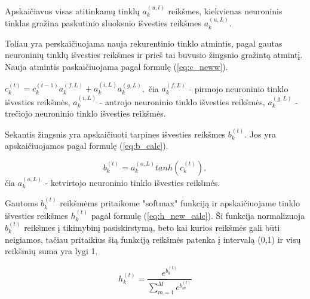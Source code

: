 Apskaičiavus visas atitinkamų tinklų \begin{math}a_k^{(u,l)}\end{math} reikšmes, kiekvienas neuroninis tinklas gražina paskutinio sluoksnio išvesties reikšmes \begin{math}a_k^{(u,L)}\end{math}.

Toliau yra perskaičiuojama nauja rekurentinio tinklo atmintis, pagal gautas neuroninių tinklų išvesties reikšmes ir prieš tai buvusio žingsnio gražintą atmintį. Nauja atmintis paskaičiuojama pagal formulę (\ref{eq:c_neww}).

\begin{math}\label{eq:c_neww}
  c_k^{(t)} = c_k^{(t-1)}a_k^{(f,L)} + a_k^{(i,L)}a_k^{(g,L)},
\end{math}
čia \begin{math}a_k^{(f,L)}\end{math} - pirmojo neuroninio tinklo išvesties reikšmės, \begin{math}a_k^{(i,L)}\end{math} - antrojo neuroninio tinklo išvesties reikšmės, \begin{math}a_k^{(g,L)}\end{math} - trečiojo neuroninio tinklo išvesties reikšmės.

Sekantis žingsnis yra apskaičiuoti tarpines išvesties reikšmes \begin{math}b_k^{(t)}\end{math}. Jos yra apskaičiuojamos pagal formulę (\ref{eq:b_calc}).

\begin{equation}\label{eq:b_calc}
  b_k^{(t)} = a_k^{(o,L)}tanh(c_k^{(t)}),
\end{equation}
čia \begin{math}a_k^{(o,L)}\end{math} - ketvirtojo neuroninio tinklo išvesties reikšmės.

Gautoms \begin{math}b_k^{(t)}\end{math} reikšmėms pritaikome "softmax" funkciją ir apskaičiuojame tinklo išvesties reikšmes \begin{math}h_k^{(t)}\end{math} pagal formulę (\ref{eq:h_new_calc}). Ši funkcija normalizuoja \begin{math}b_k^{(t)}\end{math} reikšmes į tikimybinį pasiskirstymą, beto kai kurios reikšmės gali būti neigiamos, tačiau pritaikius šią funkciją reikšmės patenka į intervalą (0,1) ir visų reikšmių suma yra lygi 1.

\begin{equation}\label{eq:h_new_calc}
  h_k^{(t)} = \frac{e^{b_k^{(t)}}}{\sum_{m=1}^M e^{b_m^{(t)}}}
\end{equation}
